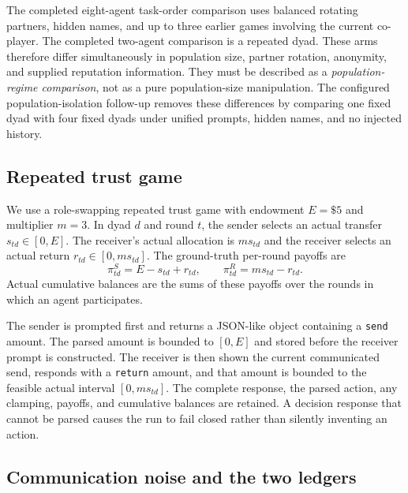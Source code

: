 The completed eight-agent task-order comparison uses balanced rotating
partners, hidden names, and up to three earlier games involving the current
co-player. The completed two-agent comparison is a repeated dyad. These arms
therefore differ simultaneously in population size, partner rotation,
anonymity, and supplied reputation information. They must be described as a
\emph{population-regime comparison}, not as a pure population-size
manipulation. The configured population-isolation follow-up removes these
differences by comparing one fixed dyad with four fixed dyads under unified
prompts, hidden names, and no injected history.

\subsection{Repeated trust game}
\label{sec:protocol-trust-game}

We use a role-swapping repeated trust game \citep{berg1995} with endowment
$E=\$5$ and multiplier $m=3$. In dyad $d$ and round $t$, the sender selects an
actual transfer $s_{td}\in[0,E]$. The receiver's actual allocation is
$m s_{td}$ and the receiver selects an actual return
$r_{td}\in[0,m s_{td}]$. The ground-truth per-round payoffs are
\begin{equation}
    \pi^{S}_{td}=E-s_{td}+r_{td},
    \qquad
    \pi^{R}_{td}=m s_{td}-r_{td}.
    \label{eq:trust-game-payoffs}
\end{equation}
Actual cumulative balances are the sums of these payoffs over the rounds in
which an agent participates.

The sender is prompted first and returns a JSON-like object containing a
\texttt{send} amount. The parsed amount is bounded to $[0,E]$ and stored before
the receiver prompt is constructed. The receiver is then shown the current
communicated send, responds with a \texttt{return} amount, and that amount is
bounded to the feasible actual interval $[0,m s_{td}]$. The complete response,
the parsed action, any clamping, payoffs, and cumulative balances are retained.
A decision response that cannot be parsed causes the run to fail closed rather
than silently inventing an action.

\subsection{Communication noise and the two ledgers}
\label{sec:protocol-noise}

